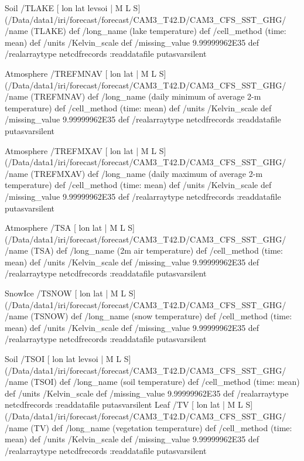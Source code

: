 \begin{ingrid}
Soil /TLAKE{
[ lon lat levsoi | M L S] (/Data/data1/iri/forecast/forecast/CAM3_T42.D/CAM3_CFS_SST_GHG/%
/name (TLAKE) def
 /long_name (lake temperature) def
 /cell_method (time: mean) def
 /units /Kelvin_scale def
 /missing_value 9.99999962E35 def
 /realarraytype netcdfrecords :readdatafile
}putasvarsilent

Atmosphere /TREFMNAV{
[ lon lat | M L S] (/Data/data1/iri/forecast/forecast/CAM3_T42.D/CAM3_CFS_SST_GHG/%
/name (TREFMNAV) def
 /long_name (daily minimum of average 2-m temperature) def
 /cell_method (time: mean) def
 /units /Kelvin_scale def
 /missing_value 9.99999962E35 def
 /realarraytype netcdfrecords :readdatafile
}putasvarsilent



Atmosphere /TREFMXAV{
[ lon lat | M L S] (/Data/data1/iri/forecast/forecast/CAM3_T42.D/CAM3_CFS_SST_GHG/%
/name (TREFMXAV) def
 /long_name (daily maximum of average 2-m temperature) def
 /cell_method (time: mean) def
 /units /Kelvin_scale def
 /missing_value 9.99999962E35 def
 /realarraytype netcdfrecords :readdatafile
}putasvarsilent

Atmosphere /TSA{
[ lon lat | M L S] (/Data/data1/iri/forecast/forecast/CAM3_T42.D/CAM3_CFS_SST_GHG/%
/name (TSA) def
 /long_name (2m air temperature) def
 /cell_method (time: mean) def
 /units /Kelvin_scale def
 /missing_value 9.99999962E35 def
 /realarraytype netcdfrecords :readdatafile
}putasvarsilent


SnowIce /TSNOW{
[ lon lat | M L S] (/Data/data1/iri/forecast/forecast/CAM3_T42.D/CAM3_CFS_SST_GHG/%
/name (TSNOW) def
 /long_name (snow temperature) def
 /cell_method (time: mean) def
 /units /Kelvin_scale def
 /missing_value 9.99999962E35 def
 /realarraytype netcdfrecords :readdatafile
}putasvarsilent


Soil /TSOI{
[ lon lat levsoi | M L S] (/Data/data1/iri/forecast/forecast/CAM3_T42.D/CAM3_CFS_SST_GHG/%
/name (TSOI) def
 /long_name (soil temperature) def
 /cell_method (time: mean) def
 /units /Kelvin_scale def
 /missing_value 9.99999962E35 def
 /realarraytype netcdfrecords :readdatafile
}putasvarsilent
Leaf /TV{
[ lon lat | M L S] (/Data/data1/iri/forecast/forecast/CAM3_T42.D/CAM3_CFS_SST_GHG/%
/name (TV) def
 /long_name (vegetation temperature) def
 /cell_method (time: mean) def
 /units /Kelvin_scale def
 /missing_value 9.99999962E35 def
 /realarraytype netcdfrecords :readdatafile
}putasvarsilent



\end{ingrid}
